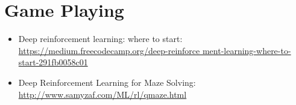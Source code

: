 \documentclass[10pt,twoside,a4paper,openany]{memoir}
\begin{document}
\section{Game Playing}
\begin{itemize}
\item Deep reinforcement learning: where to start: \href{https://medium.freecodecamp.org/deep-reinforcement-learning-where-to-start-291fb0058c01}{https://medium.freecodecamp.org/deep-reinforce ment-learning-where-to-start-291fb0058c01}
\item Deep Reinforcement Learning for Maze Solving: \href{http://www.samyzaf.com/ML/rl/qmaze.html}{http://www.samyzaf.com/ML/rl/qmaze.html}
\end{itemize}
\end{document}
